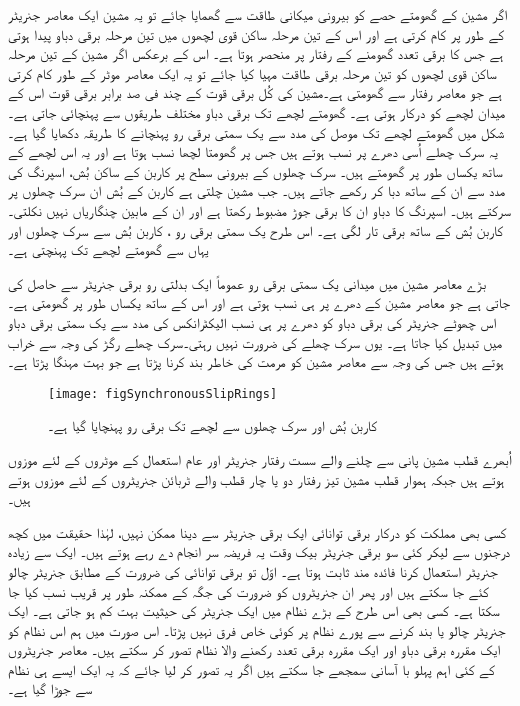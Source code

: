 اگر مشین کے گھومتے حصے کو بیرونی میکانی طاقت سے گھمایا جائے تو یہ مشین ایک معاصر جنریٹر کے طور پر کام کرتی ہے اور اس کے تین مرحلہ ساکن قوی لچھوں میں تین مرحلہ برقی دباو پیدا ہوتی ہے جس کا برقی تعدد گھومنے کے رفتار پر منحصر ہوتا ہے۔ اس کے برعکس اگر مشین کے تین  مرحلہ ساکن قوی لچھوں کو تین مرحلہ برقی طاقت مہیا کیا جائے تو یہ ایک معاصر موٹر کے طور کام کرتی ہے جو معاصر رفتار سے گھومتی ہے۔مشین کی کُل برقی قوت کے چند فی صد  برابر برقی قوت اس کے میدان لچھے کو درکار ہوتی ہے۔ گھومتے لچھے تک برقی دباو مختلف طریقوں سے پہنچائی جاتی ہے۔شکل   میں گھومتے لچھے تک موصل   کی مدد سے یک سمتی برقی رو پہنچانے کا طریقہ دکھایا گیا ہے۔ یہ سرک چھلے اُسی دھرے  پر نسب ہوتے ہیں جس پر گھومتا لچھا نسب ہوتا ہے اور یہ اس لچھے کے ساتھ یکساں طور پر گھومتے ہیں۔ سرک چھلوں  کے بیرونی سطح پر کاربن کے ساکن بُش، اسپرنگ  کی مدد سے ان کے ساتھ دبا کر رکھے جاتے ہیں۔ جب مشین چلتی ہے  کاربن کے بُش ان سرک چھلوں پر سرکتے ہیں۔ اسپرنگ کا دباو ان کا برقی جوڑ مضبوط رکھتا ہے اور ان کے مابین چنگاریاں نہیں نکلتی۔ کاربن بُش کے ساتھ برقی تار لگی ہے۔ اس طرح یک سمتی برقی رو  ، کاربن بُش سے سرک چھلوں اور یہاں سے گھومتے لچھے تک پہنچتی ہے۔

بڑے معاصر مشین میں میدانی یک سمتی برقی رو عموماً ایک بدلتی رو برقی جنریٹر سے حاصل کی جاتی ہے جو معاصر مشین کے دھرے پر ہی نسب ہوتی ہے اور اس کے ساتھ یکساں طور پر گھومتی ہے۔اس چھوٹے جنریٹر کی برقی دباو کو دھرے پر ہی نسب الیکٹرانکس کی مدد سے یک سمتی برقی دباو میں تبدیل کیا جاتا ہے۔ یوں سرک چھلے کی ضرورت نہیں رہتی۔سرک چھلے رگڑ کی وجہ سے خراب ہوتے ہیں جس کی وجہ سے معاصر مشین کو مرمت کی خاطر بند کرنا پڑتا ہے جو بہت مہنگا پڑتا ہے۔
\begin{figure}
\centering
\texttt{[image: figSynchronousSlipRings]}
\caption{کاربن بُش اور سرک چھلوں سے لچھے تک برقی رو پہنچایا گیا ہے۔}
\label{شکل_معاصر_سرک_چھلے}
\end{figure}

اُبھرے قطب مشین پانی سے چلنے والے سست رفتار جنریٹر اور  عام استعمال کے موٹروں کے لئے موزوں ہوتے ہیں جبکہ ہموار قطب مشین تیز رفتار دو یا چار قطب والے ٹربائن جنریٹروں کے لئے موزوں ہوتے ہیں۔

کسی بھی مملکت کو درکار برقی توانائی ایک برقی جنریٹر سے دینا ممکن نہیں، لہٰذا حقیقت میں کچھ درجنوں سے لیکر کئی سو برقی جنریٹر بیک وقت یہ فریضہ سر انجام دے رہے ہوتے ہیں۔ ایک سے زیادہ جنریٹر استعمال کرنا فائدہ مند ثابت ہوتا ہے۔ اوّل تو برقی توانائی کی ضرورت کے مطابق جنریٹر چالو کئے جا سکتے ہیں اور پھر ان جنریٹروں کو ضرورت کی جگہ کے ممکنہ طور پر قریب نسب کیا جا سکتا ہے۔ کسی بھی اس طرح کے بڑے نظام میں ایک جنریٹر کی حیثیت بہت کم ہو جاتی ہے۔ ایک جنریٹر چالو یا بند کرنے سے پورے نظام پر کوئی خاص فرق نہیں پڑتا۔ اس صورت میں ہم اس نظام کو ایک مقررہ برقی دباو اور ایک مقررہ برقی تعدد رکھنے والا نظام تصور کر سکتے ہیں۔ معاصر جنریٹروں کے کئی اہم پہلو با آسانی سمجھے جا سکتے ہیں اگر یہ تصور کر لیا جائے کہ یہ ایک ایسے ہی نظام سے جوڑا گیا ہے۔

